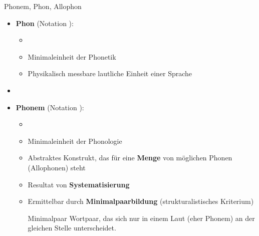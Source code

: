 \begin{frame}{Phonem, Phon, Allophon}

\begin{itemize}
	\item \textbf{Phon} (Notation \textipa{[ ]}):
	
	\begin{itemize}
		\item[]
		\item Minimaleinheit der Phonetik
		\item Physikalisch messbare lautliche Einheit einer Sprache
	\end{itemize}
	
	\item[]
	\item \textbf{Phonem} (Notation \textipa{/ /}):
	
	\begin{itemize}
		\item[]
		\item Minimaleinheit der Phonologie
		\item Abstraktes Konstrukt, das für eine \textbf{Menge} von möglichen Phonen (Allophonen) steht
		\item Resultat von \textbf{Systematisierung}
		\item Ermittelbar durch \textbf{Minimalpaarbildung} (strukturalistisches Kriterium)
		
	\begin{block}{Minimalpaar}
Wortpaar, das sich nur in einem Laut (eher Phonem) an der gleichen Stelle unterscheidet.
	\end{block}
	
	\end{itemize}
	
\end{itemize}

\end{frame}




